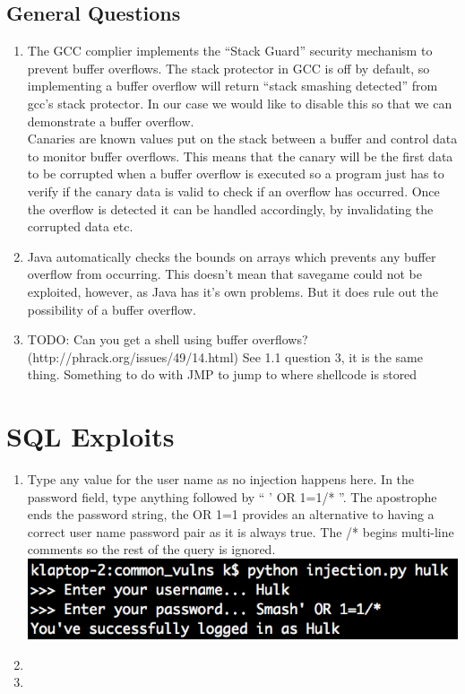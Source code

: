 \documentclass[9pt,a4paper]{article}
\begin{document}
\subsection{General Questions}
\begin{enumerate}
\item The GCC complier implements the ``Stack Guard'' security mechanism to prevent buffer overflows. The stack protector in GCC is off by default, so implementing a buffer overflow will return ``stack smashing detected'' from gcc's stack protector. In our case we would like to disable this so that we can demonstrate a buffer overflow.\\
Canaries are known values put on the stack between a buffer and control data to monitor buffer overflows. This means that the canary will be the first data to be corrupted when a buffer overflow is executed so a program just has to verify if the canary data is valid to check if an overflow has occurred. Once the overflow is detected it can be handled accordingly, by invalidating the corrupted data etc.
\item Java automatically checks the bounds on arrays which prevents any buffer overflow from occurring. This doesn't mean that savegame could not be exploited, however, as Java has it's own problems. But it does rule out the possibility of a buffer overflow.
\item TODO: Can you get a shell using buffer overflows? (http://phrack.org/issues/49/14.html) See 1.1 question 3, it is the same thing. Something to do with JMP to jump to where shellcode is stored
\end{enumerate}


\section{SQL Exploits}
\begin{enumerate}
\item Type any value for the user name as no injection happens here. In the password field, type anything followed by `` ' OR 1=1/* ''. The apostrophe ends the password string, the OR 1=1 provides an alternative to having a correct user name password pair as it is always true. The /* begins multi-line comments so the rest of the query is ignored.\\
\includegraphics{inject}
\item
\item
\end{enumerate}
\end{document}

